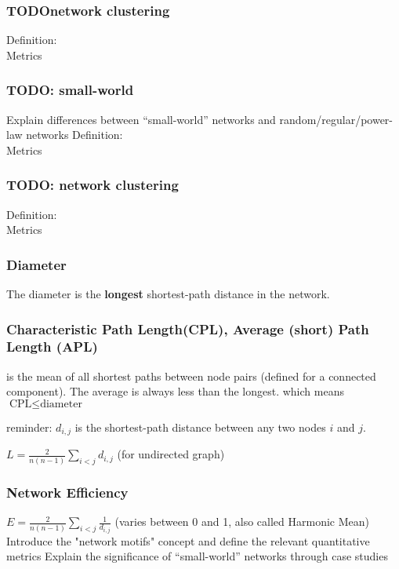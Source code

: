 \documentclass[crop=false]{standalone}
\begin{document}
\subsubsection{ TODOnetwork clustering}
Definition:\\
Metrics\\
\subsubsection{ TODO: small-world}
Explain differences between “small-world” networks and random/regular/power-law networks 
Definition:\\
Metrics
\subsubsection{ TODO: network clustering}
Definition:\\
Metrics\\

\subsubsection{Diameter}
The diameter is the \textbf{longest} shortest-path distance in the network.

\subsubsection{Characteristic Path Length(CPL), Average (short) Path Length (APL)} 
is the mean of all shortest paths between node pairs (defined for a connected component).
The average is always less than the longest. which means \\$\text{CPL} \leq \text{diameter} $

reminder:  $d_{i,j}$ is the shortest-path distance between any two nodes $i$ and $j$.

$L = \frac{2}{n(n-1)} \sum_{i < j} d_{i,j}$ (for undirected graph)

\subsubsection{Network Efficiency}
$E = \frac{2}{n(n-1)} \sum_{i < j} \frac{1}{d_{i,j}}$ (varies between 0 and 1, also called Harmonic Mean)
Introduce the "network motifs" concept and define the relevant quantitative metrics
Explain the significance of “small-world” networks through case studies 
    
\end{document}
